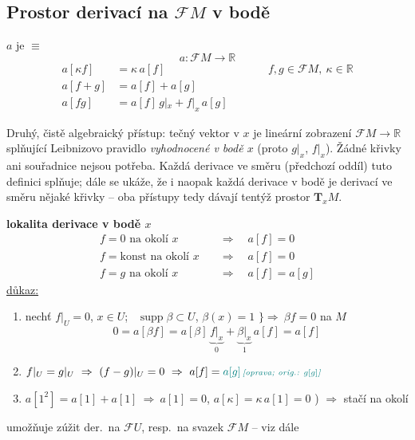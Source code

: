 \newpage
{}
\subsection{Prostor derivací na $\mathcal{F}M$ v bodě}

\begin{definice}
$a$ je  $\equiv$
\[
  a:\mathcal{F}M\to\mathbb{R}
\]
\begin{align*}
  a[\kappa f] &= \kappa\,a[f] &&\qquad f,g\in\mathcal{F}M,\ \kappa\in\mathbb{R} \\
  a[f+g] &= a[f] + a[g] \\
  a[fg] &= a[f]\,g|_x + f|_x\,a[g]
\end{align*}
\end{definice}

\begin{vysvetleni}
Druhý, čistě algebraický přístup: tečný vektor v $x$ je lineární zobrazení $\mathcal{F}M\to\mathbb{R}$ splňující Leibnizovo pravidlo \emph{vyhodnocené v bodě $x$} (proto $g|_x$, $f|_x$). Žádné křivky ani souřadnice nejsou potřeba. Každá derivace ve směru (předchozí oddíl) tuto definici splňuje; dále se ukáže, že i naopak každá derivace v bodě je derivací ve směru nějaké křivky -- oba přístupy tedy dávají tentýž prostor $\mathbf{T}_xM$.
\end{vysvetleni}

\textbf{lokalita derivace v bodě $x$}
\begin{align*}
  f = 0 \text{ na okolí } x &\quad\Rightarrow\quad a[f] = 0 \\
  f = \text{konst na okolí } x &\quad\Rightarrow\quad a[f] = 0 \\
  f = g \text{ na okolí } x &\quad\Rightarrow\quad a[f] = a[g]
\end{align*}
\underline{důkaz:}
\begin{enumerate}[label=\arabic*), nosep]
  \item nechť $f|_U = 0$, $x\in U$; \ $\operatorname{supp}\beta\subset U$, $\beta(x) = 1$ \quad $\Big\}\Rightarrow\ \beta f = 0$ na $M$
  \[
    0 = a[\beta f] = a[\beta]\,\underbrace{f|_x}_{0} + \underbrace{\beta|_x}_{1}\,a[f] = a[f]
  \]
  \item[3)] $f|_U = g|_U \ \Rightarrow\ (f-g)|_U = 0 \ \Rightarrow\ a[f] = \oprava{a[g]}{g[g]}$
  \item[2)] $a[1^2] = a[1] + a[1] \ \Rightarrow\ a[1] = 0$, \qquad $a[\kappa] = \kappa\,a[1] = 0$ ) $\Rightarrow$ stačí na okolí
\end{enumerate}
umožňuje zúžit der.\ na $\mathcal{F}U$, resp.\ na svazek $\mathcal{F}M$ -- viz dále

